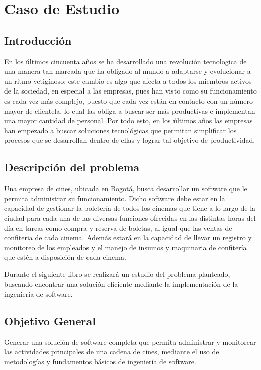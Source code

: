\chapter{Caso de Estudio}

\section{Introducción}

En los últimos cincuenta años se ha desarrollado una revolución tecnologica de una manera tan marcada que ha obligado al mundo a adaptarse y evolucionar a un ritmo vetigínoso; este cambio es algo que afecta a todos los miembros activos de la sociedad, en especial a las empresas, pues han visto como su funcionamiento es cada vez más complejo, puesto que cada vez están en contacto con un número mayor de clientela, lo cual las obliga a buscar ser más productivas e implementan una mayor cantidad de personal. Por todo esto, en los últimos años las empresas han empezado a buscar soluciones tecnológicas que permitan simplificar los procesos que se desarrollan dentro de ellas y lograr tal objetivo de productividad.
 
\section{Descripción del problema}

Una empresa de cines, ubicada en Bogotá, busca desarrollar un software que le permita administrar su funcionamiento. Dicho software debe estar en la capacidad de gestionar la boletería de todos los cinemas que tiene a lo largo de la ciudad para cada una de las diversas funciones ofrecidas en las distintas horas del día en tareas como compra y reserva de boletas, al igual que las ventas de confiteria de cada cinema. Además estará en la capacidad de llevar un registro y monitoreo de los empleados y el manejo de insumos y maquinaria de confitería que estén a disposición de cada cinema.

Durante el siguiente libro se realizará un estudio del problema planteado, buscando encontrar una solución eficiente mediante la implementación de la ingeniería de software.

\section{Objetivo General}
Generar una solución de software completa que permita administrar y monitorear las actividades principales de una cadena de cines, mediante el uso de metodologías y fundamentos básicos de ingeniería de software.

